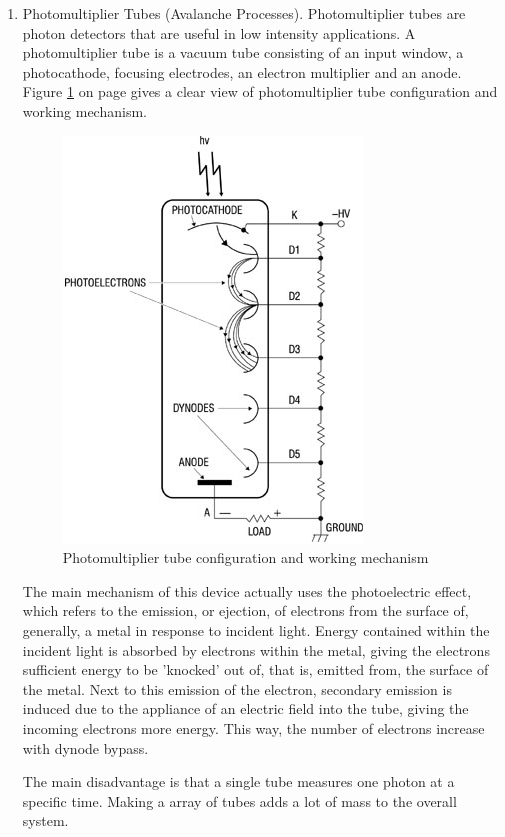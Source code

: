 \begin{enumerate}[i]
\item Photomultiplier Tubes (Avalanche Processes). Photomultiplier tubes are photon detectors that are useful in low intensity applications. A photomultiplier tube is a vacuum tube consisting of an input window, a photocathode, focusing electrodes, an electron multiplier and an anode.
Figure \ref{Photomultiplier} on page \pageref{Photomultiplier} gives a clear view of photomultiplier tube configuration and working mechanism.
\begin{figure} [h]
	\begin{center}
\includegraphics[scale=3]{chapters/img/DO_receiver1.jpg}	
\caption{Photomultiplier tube configuration and working mechanism}
\label{Photomultiplier}
\end{center}
\end{figure}

The main mechanism of this device actually uses the photoelectric effect, which refers to the emission, or ejection, of electrons from the surface of, generally, a metal in response to incident light. Energy contained within the incident light is absorbed by electrons within the metal, giving the electrons sufficient energy to be 'knocked' out of, that is, emitted from, the surface of the metal. Next to this emission of the electron, secondary emission is induced due to the appliance of an electric field into the tube, giving the incoming electrons more energy. This way, the number of electrons increase with dynode bypass. 

The main disadvantage is that a single tube measures one photon at a specific time. Making a array of tubes adds a lot of mass to the overall system. 


\end{enumerate}
